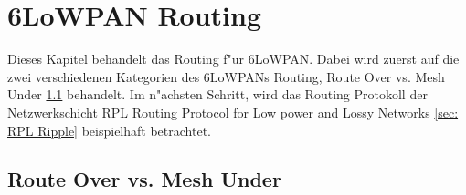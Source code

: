 \documentclass[final]{lktseminar}
\begin{document}



\section{6LoWPAN Routing}
\label{sec: 6LoWPAN Routing}

Dieses Kapitel behandelt das Routing f"ur 6LoWPAN. Dabei wird zuerst auf die zwei verschiedenen
Kategorien des 6LoWPANs Routing, Route Over vs. Mesh Under \ref{sec: Route Over vs. Mesh Under} behandelt.
Im n"achsten Schritt, wird das Routing Protokoll der Netzwerkschicht RPL Routing Protocol for Low power and Lossy Networks
\ref{sec: RPL Ripple} beispielhaft betrachtet.

\subsection{Route Over vs. Mesh Under}
\label{sec: Route Over vs. Mesh Under}
\end{document}
